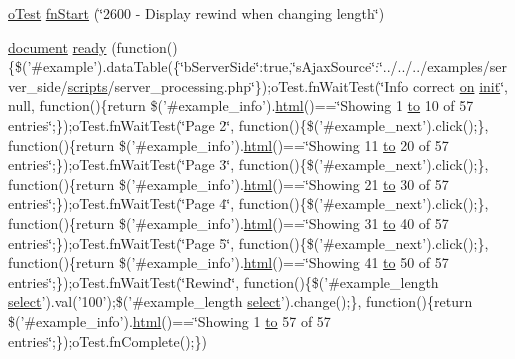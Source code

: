 \begin{DoxyCompactItemize}
\item 
\hyperlink{unit__test_8js_a3b2d259e2df3b6860d9047a92d09d0d6}{o\+Test} \hyperlink{4__server-side_22600_8js_ae41710192baa73788b99f29c94e466cb}{fn\+Start} (\char`\"{}2600 -\/ Display rewind when changing length\char`\"{})
\item 
\hyperlink{outside_events_8js_aa14f8e0338cced6720590fd2ea13bd4b}{document} \hyperlink{4__server-side_22600_8js_aba2973711f28e30ab228253e91a0d6ed}{ready} (function()\{\$('\#example').data\+Table(\{\char`\"{}b\+Server\+Side\char`\"{}\+:true,\char`\"{}s\+Ajax\+Source\char`\"{}\+:\char`\"{}../../../examples/server\+\_\+side/\hyperlink{tinymce_8jquery_8dev_8js_a09066d4d580eeec222f858d588b4cdef}{scripts}/server\+\_\+processing.\+php\char`\"{}\});o\+Test.\+fn\+Wait\+Test(\char`\"{}Info correct \hyperlink{fullpage_2plugin_8min_8js_a1cfa98b7fed2aaf9fee3b68dbb7f9497}{on} \hyperlink{mctabs_8js_a936fb06176b01ffb1fc69eb4d1e2f67d}{init}\char`\"{}, null, function()\{return \$('\#example\+\_\+info').\hyperlink{tinymce_8jquery_8dev_8js_ac2090bcf2ff968c0083d5de53a6544f3}{html}()==\char`\"{}Showing 1 \hyperlink{jquery-ui_8js_af6086621f45baa2cf538f19e45d3c263}{to} 10 of 57 entries\char`\"{};\});o\+Test.\+fn\+Wait\+Test(\char`\"{}Page 2\char`\"{}, function()\{\$('\#example\+\_\+next').click();\}, function()\{return \$('\#example\+\_\+info').\hyperlink{tinymce_8jquery_8dev_8js_ac2090bcf2ff968c0083d5de53a6544f3}{html}()==\char`\"{}Showing 11 \hyperlink{jquery-ui_8js_af6086621f45baa2cf538f19e45d3c263}{to} 20 of 57 entries\char`\"{};\});o\+Test.\+fn\+Wait\+Test(\char`\"{}Page 3\char`\"{}, function()\{\$('\#example\+\_\+next').click();\}, function()\{return \$('\#example\+\_\+info').\hyperlink{tinymce_8jquery_8dev_8js_ac2090bcf2ff968c0083d5de53a6544f3}{html}()==\char`\"{}Showing 21 \hyperlink{jquery-ui_8js_af6086621f45baa2cf538f19e45d3c263}{to} 30 of 57 entries\char`\"{};\});o\+Test.\+fn\+Wait\+Test(\char`\"{}Page 4\char`\"{}, function()\{\$('\#example\+\_\+next').click();\}, function()\{return \$('\#example\+\_\+info').\hyperlink{tinymce_8jquery_8dev_8js_ac2090bcf2ff968c0083d5de53a6544f3}{html}()==\char`\"{}Showing 31 \hyperlink{jquery-ui_8js_af6086621f45baa2cf538f19e45d3c263}{to} 40 of 57 entries\char`\"{};\});o\+Test.\+fn\+Wait\+Test(\char`\"{}Page 5\char`\"{}, function()\{\$('\#example\+\_\+next').click();\}, function()\{return \$('\#example\+\_\+info').\hyperlink{tinymce_8jquery_8dev_8js_ac2090bcf2ff968c0083d5de53a6544f3}{html}()==\char`\"{}Showing 41 \hyperlink{jquery-ui_8js_af6086621f45baa2cf538f19e45d3c263}{to} 50 of 57 entries\char`\"{};\});o\+Test.\+fn\+Wait\+Test(\char`\"{}Rewind\char`\"{}, function()\{\$('\#example\+\_\+length \hyperlink{validate_8js_a107b4864f70df98ef4a521c0b2bc80c7}{select}').val('100');\$('\#example\+\_\+length \hyperlink{validate_8js_a107b4864f70df98ef4a521c0b2bc80c7}{select}').change();\}, function()\{return \$('\#example\+\_\+info').\hyperlink{tinymce_8jquery_8dev_8js_ac2090bcf2ff968c0083d5de53a6544f3}{html}()==\char`\"{}Showing 1 \hyperlink{jquery-ui_8js_af6086621f45baa2cf538f19e45d3c263}{to} 57 of 57 entries\char`\"{};\});o\+Test.\+fn\+Complete();\})
\end{DoxyCompactItemize}


